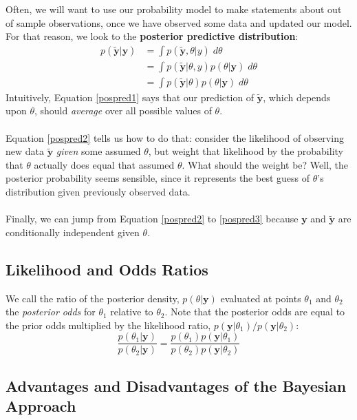 \documentclass[a4paper,12pt]{scrartcl}
\begin{document}
Often, we will want to use our probability model to make statements
about out of sample observations, once we have observed some data
and updated our model.  For that reason, we look to the
\textbf{posterior predictive distribution}:
\begin{align}
   p(\tilde{\mathbf{y}} | \mathbf{y}) &= \int p(\tilde{\mathbf{y}}, 
       \theta | y) \; d\theta \label{pospred1}\\
   &= \int p(\tilde{\mathbf{y}} | \theta , y) p(\theta | \mathbf{y})
       \; d\theta \label{pospred2}\\
   &= \int p(\tilde{\mathbf{y}} | 
      \theta) p(\theta | \mathbf{y} ) \; d\theta 
	\label{pospred3}
\end{align}
Intuitively, Equation \ref{pospred1} says that our prediction of 
$\tilde{\mathbf{y}}$, which depends upon $\theta$, 
should \emph{average} over all possible 
values of $\theta$.
\\
\\
Equation \ref{pospred2} tells us how
to do that: consider the likelihood of observing new 
data $\tilde{\mathbf{y}}$ \emph{given} some assumed $\theta$, 
but weight
that likelihood by the probability that $\theta$ actually does
equal that assumed $\theta$.  What should the weight be? Well,
the posterior probability seems sensible, since it represents
the best guess of $\theta$'s distribution given previously
observed data.
\\
\\
Finally, we can jump from Equation \ref{pospred2} to 
\ref{pospred3} because $\mathbf{y}$
and $\tilde{\mathbf{y}}$ are conditionally independent given 
$\theta$.

\subsection{Likelihood and Odds Ratios}

We call the ratio of the posterior density, $p(\theta | \mathbf{y})$ 
evaluated at points $\theta_1$ and $\theta_2$ the \emph{posterior odds}
for $\theta_1$ relative to $\theta_2$. Note that the posterior
odds are equal to the prior odds multiplied by the likelihood 
ratio, $p( \mathbf{y} | \theta_1)/p( \mathbf{y} | \theta_2)$:
   \[ \frac{p(\theta_1 | \mathbf{y})}{p(\theta_2 | \mathbf{y})}
      = \frac{p(\theta_1) p(\mathbf{y} | \theta_1)}{p(\theta_2)
	 p(\mathbf{y} | \theta_2)} \]


\subsection{Advantages and Disadvantages of the Bayesian Approach}
\end{document}
